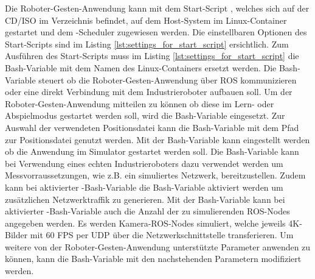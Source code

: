 Die Roboter-Gesten-Anwendung kann mit dem Start-Script , welches sich auf der CD/ISO im Verzeichnis  befindet, auf dem Host-System im Linux-Container gestartet und dem -Scheduler zugewiesen werden. Die einstellbaren Optionen des Start-Scripts sind im Listing \ref{lst:settings_for_start_script} ersichtlich. Zum Ausführen des Start-Scripts muss im Listing \ref{lst:settings_for_start_script} die Bash-Variable  mit dem Namen des Linux-Containers ersetzt werden. Die Bash-Variable  steuert ob die Roboter-Gesten-Anwendung über ROS kommunizieren oder eine direkt Verbindung mit dem Industrieroboter aufbauen soll. Um der Roboter-Gesten-Anwendung mitteilen zu können ob diese im Lern- oder Abspielmodus gestartet werden soll, wird die Bash-Variable  eingesetzt. Zur Auswahl der verwendeten Positionsdatei kann die Bash-Variable  mit dem Pfad zur Positionsdatei genutzt werden. Mit der Bash-Variable  kann eingestellt werden ob die Anwendung im Simulator gestartet werden soll. Die Bash-Variable  kann bei Verwendung eines echten Industrieroboters dazu verwendet werden um Messvorraussetzungen, wie z.B. ein simuliertes Netzwerk, bereitzustellen. Zudem kann bei aktivierter -Bash-Variable die Bash-Variable  aktiviert werden um zusätzlichen Netzwerktraffik zu generieren. Mit der Bash-Variable  kann bei aktivierter -Bash-Variable auch die Anzahl der zu simulierenden ROS-Nodes angegeben werden. Es werden Kamera-ROS-Nodes simuliert, welche jeweils 4K-Bilder mit 60 FPS per UDP über die Netzwerkschnittstelle transferieren. Um weitere von der Roboter-Gesten-Anwendung unterstützte Parameter anwenden zu können, kann die Bash-Variable  mit den nachstehenden Parametern modifiziert werden.

